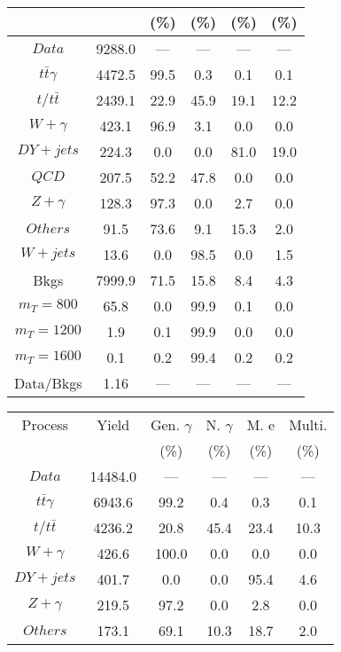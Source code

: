 \begin{figure}
\begin{minipage}[c]{0.32\textwidth}
{\begin{tabular}{cccccc}
 &  & (\%) & (\%) & (\%) & (\%)  \\
\hline
                                                                      $ Data $ &  9288.0 &  --- &  --- &  --- &  ---\\
$ t\bar{t}\gamma $ &  4472.5 &  99.5 &  0.3 &  0.1 &  0.1\\
$ t/t\bar{t} $ &  2439.1 &  22.9 &  45.9 &  19.1 &  12.2\\
$ W+\gamma $ &  423.1 &  96.9 &  3.1 &  0.0 &  0.0\\
$ DY+jets $ &  224.3 &  0.0 &  0.0 &  81.0 &  19.0\\
$ QCD $ &  207.5 &  52.2 &  47.8 &  0.0 &  0.0\\
$ Z+\gamma $ &  128.3 &  97.3 &  0.0 &  2.7 &  0.0\\
$ Others $ &  91.5 &  73.6 &  9.1 &  15.3 &  2.0\\
$ W+jets $ &  13.6 &  0.0 &  98.5 &  0.0 &  1.5\\
Bkgs &  7999.9 &  71.5 &  15.8 &  8.4 &  4.3\\
$ m_{T} = 800 $ &  65.8 &  0.0 &  99.9 &  0.1 &  0.0\\
$ m_{T} = 1200 $ &  1.9 &  0.1 &  99.9 &  0.0 &  0.0\\
$ m_{T} = 1600 $ &  0.1 &  0.2 &  99.4 &  0.2 &  0.2\\
Data/Bkgs &  1.16 &  --- &  --- &  --- &  ---\\
\hline
\end{tabular}
}
\end{minipage}
\begin{minipage}[c]{0.32\textwidth}
\centering
\tiny{
\begin{tabular}{cccccc}
\hline
Process & Yield & Gen. $\gamma$ & N. $\gamma$ & M. e & Multi. \\
 &  & (\%) & (\%) & (\%) & (\%)  \\
\hline
                                                                      $ Data $ &  14484.0 &  --- &  --- &  --- &  ---\\
$ t\bar{t}\gamma $ &  6943.6 &  99.2 &  0.4 &  0.3 &  0.1\\
$ t/t\bar{t} $ &  4236.2 &  20.8 &  45.4 &  23.4 &  10.3\\
$ W+\gamma $ &  426.6 &  100.0 &  0.0 &  0.0 &  0.0\\
$ DY+jets $ &  401.7 &  0.0 &  0.0 &  95.4 &  4.6\\
$ Z+\gamma $ &  219.5 &  97.2 &  0.0 &  2.8 &  0.0\\
$ Others $ &  173.1 &  69.1 &  10.3 &  18.7 &  2.0\\

\end{tabular}}
\end{minipage}
\end{figure}

